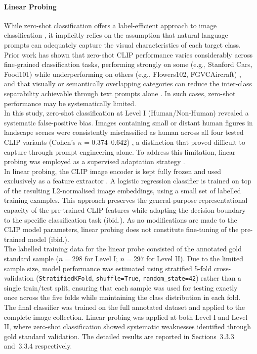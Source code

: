 \documentclass[hidelinks, 11pt]{article}
\begin{document}
\paragraph{Linear Probing}
While zero-shot classification offers a label-efficient approach to image classification \citep{liao_mapping_2025}, it implicitly relies on the
assumption that natural language prompts can adequately capture the visual characteristics of each target class. Prior work has shown that zero-shot CLIP performance varies considerably across fine-grained classification tasks, performing strongly on some (e.g., Stanford Cars, Food101) while underperforming on others (e.g., Flowers102, FGVCAircraft) \citep{radford_learning_2021}, and that visually or semantically overlapping categories can reduce the
inter-class separability achievable through text prompts alone \citep{liao_mapping_2025}. In such cases, zero-shot performance may be systematically limited.
\\
In this study, zero-shot classification at Level I (Human/Non-Human) revealed a systematic false-positive bias. Images containing small or distant human figures in landscape scenes were consistently misclassified
as human across all four tested CLIP variants (Cohen's $\kappa$ = 0.374--0.642) \citep{cohen_coefficient_1960}, a distinction that proved difficult to capture through prompt engineering alone. To address this limitation, linear probing was employed as a supervised adaptation strategy \citep{radford_learning_2021}.
\\
In linear probing, the CLIP image encoder is kept fully frozen and used exclusively as a feature extractor \citep{radford_learning_2021}. A logistic regression classifier is trained on top of the resulting
L2-normalised image embeddings, using a small set of labelled training examples. This approach preserves the general-purpose representational capacity of the pre-trained CLIP features while adapting the decision boundary to the specific classification task (ibid.). As no modifications are made to the CLIP model parameters, linear probing does not constitute fine-tuning of the pre-trained model (ibid.).
\\
The labelled training data for the linear probe consisted of the annotated gold standard sample ($n = 298$ for Level I; $n = 297$ for Level II). Due to the limited sample size, model performance was estimated using stratified 5-fold cross-validation (\texttt{StratifiedKFold}, \texttt{shuffle=True}, \texttt{random\_state=42}) rather than a single train/test split, ensuring that each sample was used for testing exactly once across the five folds while maintaining the class distribution in each fold. The final classifier was trained on the full annotated dataset and applied to the complete image collection. Linear probing was applied at both Level I and Level II, where zero-shot classification showed systematic weaknesses identified through gold standard validation. The detailed results are reported in Sections~3.3.3 and~3.3.4 respectively.
\end{document}
